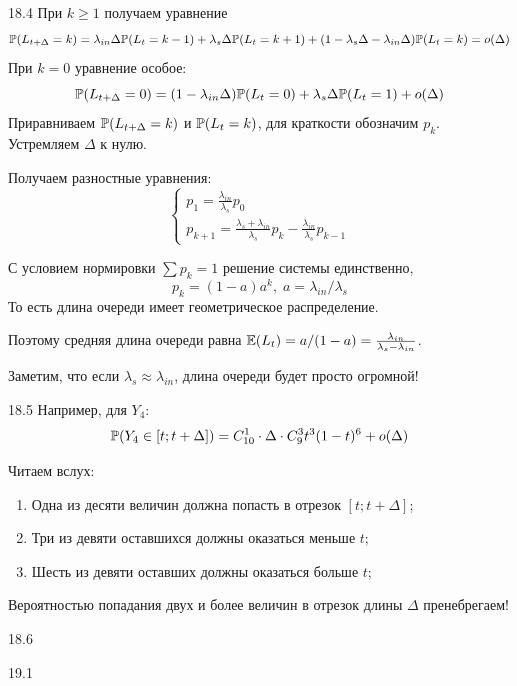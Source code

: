\begin{solution}{{18.4}}
  При $k\geq 1$ получаем уравнение
  \[
     \P(L_{t+\Delta} = k) = \lambda_{in}\Delta \P(L_t = k-1) + \lambda_s \Delta \P(L_t = k + 1) + (1-\lambda_s \Delta - \lambda_{in}\Delta) \P(L_t = k) = o(\Delta)
  \]
  При $k=0$ уравнение особое:
  \[
     \P(L_{t+\Delta} = 0) = (1 - \lambda_{in}\Delta) \P(L_t = 0) + \lambda_s \Delta \P(L_t = 1) + o(\Delta)
  \]
  Приравниваем $\P(L_{t+\Delta} = k)$ и $\P(L_t = k)$, для краткости обозначим $p_k$. Устремляем $\Delta$ к нулю.

  Получаем разностные уравнения:
  \[
  \begin{cases}
    p_1 = \frac{\lambda_{in}}{\lambda_s} p_0 \\
    p_{k+1} = \frac{\lambda_s + \lambda_{in}}{\lambda_s} p_k - \frac{\lambda_{in}}{\lambda_s}p_{k-1}
  \end{cases}
  \]

  С условием нормировки $\sum p_k = 1$ решение системы единственно,
  \[
      p_k = (1 - a)a^k, \; a = \lambda_{in}/\lambda_s
  \]
  То есть длина очереди имеет геометрическое распределение.

  Поэтому средняя длина очереди равна $\E(L_t) = a/(1-a)=\frac{\lambda_{in}}{\lambda_s - \lambda_{in}}$.

  Заметим, что если $\lambda_s \approx \lambda_{in}$, длина очереди будет просто огромной!
\end{solution}
\protect \hypertarget {soln:18.5}{}
\begin{solution}{{18.5}}
  Например, для $Y_4$:
  \[
    \P(Y_4 \in [t; t+\Delta]) = C_{10}^1 \cdot \Delta \cdot C_{9}^3 t^3 (1-t)^6 + o(\Delta)
  \]

  Читаем вслух:
  \begin{enumerate}
    \item Одна из десяти величин должна попасть в отрезок $[t; t + \Delta]$;
    \item Три из девяти оставшихся должны оказаться меньше $t$;
    \item Шесть из девяти оставших должны оказаться больше $t$;
  \end{enumerate}
  Вероятностью попадания двух и более величин в отрезок длины $\Delta$ пренебрегаем!
\end{solution}
\protect \hypertarget {soln:18.6}{}
\begin{solution}{{18.6}}
\end{solution}
\protect \hypertarget {soln:19.1}{}
\begin{solution}{{19.1}}
\end{solution}
